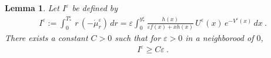\documentclass[reqno, 12pt, a4paper]{amsart}
\theoremstyle{plain}
\newtheorem{lemma}[theorem]{Lemma}
\theoremstyle{definition}
\begin{document}
\begin{lemma}
\label{lem:Iepsilon}
Let $I^\varepsilon$ be defined by 
\begin{equation}
\begin{split}
I^\varepsilon := \int_0^{T^\varepsilon_*}  \, r \,  (-\dot{\mu}_r^\varepsilon)  \, dr  =  \varepsilon  \int_0^{y_*^\varepsilon} \frac{h(x) }{\varepsilon f(x) + xh(x)} \, U^\varepsilon (x) \, e^{-V^\varepsilon (x)} \, dx  \ .
\end{split}
\end{equation}
There exists a constant $C>0$ such that for $\varepsilon>0$ in a neighborood of $0$, 
\begin{equation}
\begin{split}
I^\varepsilon \ge C \varepsilon  \ .
\end{split}
\end{equation}
\end{lemma}
\end{document}

